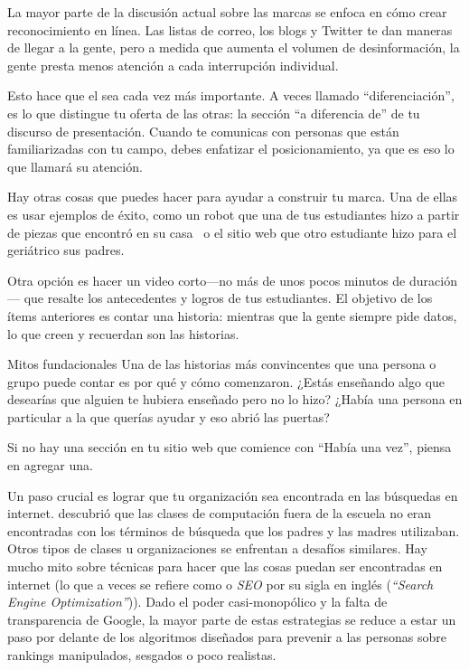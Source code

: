La mayor parte de la discusión actual sobre las marcas se enfoca 
en cómo crear reconocimiento en línea.
Las listas de correo,
los blogs
y Twitter te dan maneras de llegar a la gente,
pero a medida que aumenta el volumen de desinformación,
la gente presta menos atención a cada interrupción individual.

Esto hace que el  sea cada vez más importante.
A veces llamado ``diferenciación'',
es lo que distingue tu oferta de las otras: la sección ``a diferencia de'' de tu discurso de presentación.
Cuando te comunicas con personas que están familiarizadas con tu campo,
debes enfatizar el posicionamiento,
ya que es eso lo que llamará su atención.

Hay otras cosas que puedes hacer para ayudar a construir tu marca.
Una de ellas es usar ejemplos de éxito, como un robot que una de tus estudiantes 
hizo a partir de piezas que encontró en su casa~\cite{Schw2013}
o el sitio web que otro estudiante hizo para el geriátrico sus padres.

Otra opción es hacer un video corto---no más de unos pocos minutos de duración---
que resalte los antecedentes y logros de tus estudiantes.
El objetivo de los ítems anteriores es contar una historia:
mientras que la gente siempre pide datos,
lo que creen y recuerdan son las historias.

\begin{aside}{Mitos fundacionales}
Una de las historias más convincentes que una persona o grupo puede contar es
por qué y cómo comenzaron.
¿Estás enseñando algo que desearías que alguien te hubiera enseñado pero no lo hizo?
¿Había una persona en particular a la que querías ayudar
y eso abrió las puertas?

Si no hay una sección en tu sitio web que comience con ``Había una vez'',
piensa en agregar una.
\end{aside}

Un paso crucial es lograr que tu organización sea encontrada en las búsquedas en internet. 
\cite{DiSa2014b} descubrió que
las clases de computación fuera de la escuela no eran encontradas con los términos de búsqueda que los padres y las madres utilizaban. Otros tipos de clases u organizaciones se enfrentan a desafíos similares.
Hay mucho mito sobre técnicas para hacer que las cosas puedan ser encontradas en internet (lo que a veces se refiere como  o \emph{SEO} por su sigla en inglés (\emph{``Search Engine Optimization''})). 
Dado el poder casi-monopólico y la falta de transparencia de Google,
la mayor parte de estas estrategias se reduce a estar un paso por delante de los
algoritmos diseñados para prevenir a las personas sobre rankings manipulados, sesgados o poco realistas.

